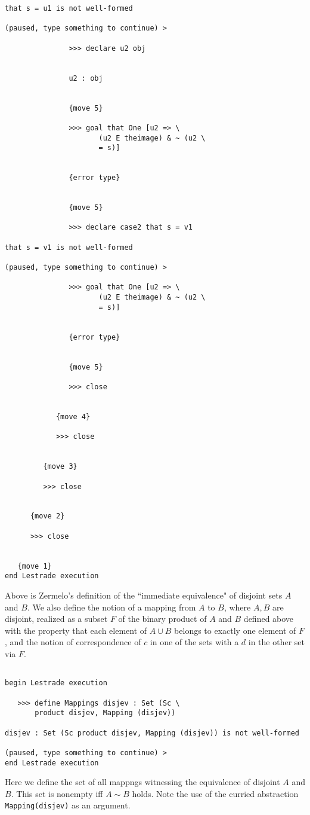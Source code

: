 \documentclass[12pt]{article}
\begin{document}
\begin{verbatim}
that s = u1 is not well-formed

(paused, type something to continue) >

               >>> declare u2 obj


               u2 : obj


               {move 5}

               >>> goal that One [u2 => \
                      (u2 E theimage) & ~ (u2 \
                      = s)]


               {error type}


               {move 5}

               >>> declare case2 that s = v1

that s = v1 is not well-formed

(paused, type something to continue) >

               >>> goal that One [u2 => \
                      (u2 E theimage) & ~ (u2 \
                      = s)]


               {error type}


               {move 5}

               >>> close


            {move 4}

            >>> close


         {move 3}

         >>> close


      {move 2}

      >>> close


   {move 1}
end Lestrade execution
\end{verbatim}

Above is Zermelo's definition of the ``immediate equivalence" of disjoint sets $A$ and $B$.  We also define the notion of a mapping from $A$ to $B$, where $A,B$ are disjoint, 
realized as a subset $F$ of the binary product of $A$ and $B$ defined above with the property that each element of $A \cup B$ belongs to exactly one element of $F$, and the notion of correspondence of $c$ in one of the sets with a $d$ in the other set via $F$.

\begin{verbatim}

begin Lestrade execution

   >>> define Mappings disjev : Set (Sc \
       product disjev, Mapping (disjev))

disjev : Set (Sc product disjev, Mapping (disjev)) is not well-formed

(paused, type something to continue) >
end Lestrade execution
\end{verbatim}

Here we define the set of all mappngs witnessing the equivalence of disjoint $A$ and $B$.  This set is nonempty iff $A \sim B$ holds.  Note the use of the curried abstraction
{\tt Mapping(disjev)} as an argument.
\end{document}
